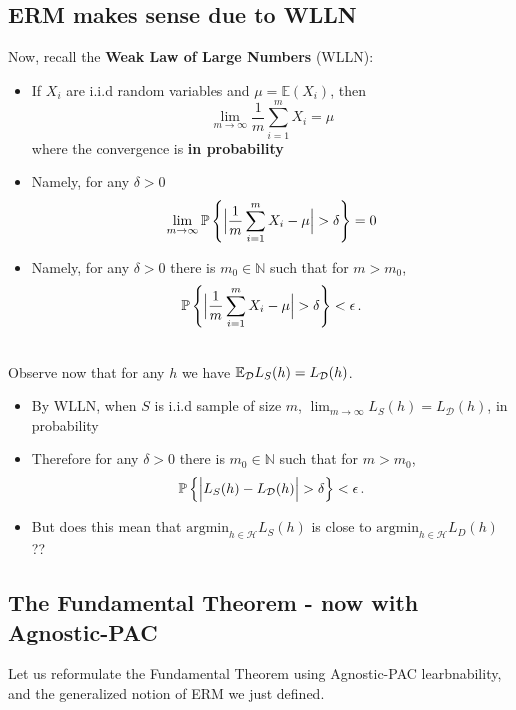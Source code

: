 \documentclass[11pt]{article}
\newcommand{\Dc}{\mathcal{D}}
\newcommand{\Hc}{\mathcal{H}}
\begin{document}
\subsection{ERM makes sense due to WLLN}

Now, recall the {\bf Weak Law of Large Numbers} (WLLN):
\begin{itemize}
     \item  If $X_i$ are i.i.d
       random variables and $\mu=\mathbb{E}(X_i)$, then
       \[
	 \lim_{m\to\infty} \frac{1}{m}\sum_{i=1}^m X_i = \mu
       \]
       where the convergence is {\bf in probability}
     \item Namely, for any $\delta>0$
\[
  \lim_{m\to\infty} \prob\left\{ \Big|   \frac{1}{m}\sum_{i=1}^m X_i - \mu \Big|>\delta \right\} =0
\]
\item Namely, for any $\delta>0$ there is $m_0\in\mathbb{N}$ such that for $m>m_0$,
\[
  \prob\left\{ \Big|   \frac{1}{m}\sum_{i=1}^m X_i - \mu \Big|>\delta \right\} <
  \epsilon\,.
\]
   \end{itemize}
~\\
Observe now that for any $h$ we have $\E_\Dc L_S(h) = L_\Dc(h)$. 
\begin{itemize}
	\item By WLLN, when $S$ is i.i.d sample of size $m$, 
	  $\lim_{m\to\infty} L_S(h) = L_\Dc(h)$, in probability
	\item Therefore for any
 $\delta>0$ there is $m_0\in\mathbb{N}$ such that for $m>m_0$,
\[
  \prob\left\{ \Big| L_S(h) - L_\Dc(h)  \Big|>\delta \right\} <
  \epsilon\,.
\]
\item But does this mean that $ \text{argmin}_{h\in\Hc}L_S(h)$ is close to 
   $ \text{argmin}_{h\in\Hc}L_D(h)$ ??
\end{itemize}


\subsection{The Fundamental Theorem - now with Agnostic-PAC}

Let us reformulate the Fundamental Theorem using Agnostic-PAC learbnability, and
the generalized notion of ERM we just defined.
\end{document}
